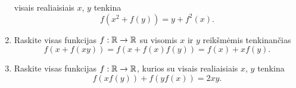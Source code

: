 \begin{enumerate}
    visais realiaisiais $x$, $y$ tenkina $$f(x^2 + f(y)) = y + f^2(x).$$
  \item Raskite visas funkcijas $f:\mathbb R \to \mathbb R$ su visomis $x$ ir $y$
    reikšmėmis tenkinančias $$f(x +f(xy))=f(x+f(x)f(y))=f(x)+xf(y).$$
  \item Raskite visas funkcijas $f:\mathbb R\to\mathbb R$, kurios su visais realiaisiais
    $x$, $y$ tenkina $$f(xf(y))+f(yf(x))=2xy.$$

\end{enumerate}
